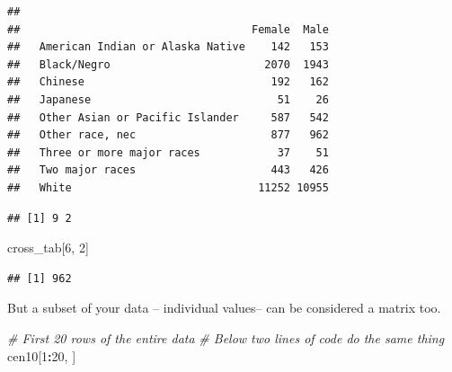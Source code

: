 \documentclass[]{book}
\newenvironment{Shaded}{\begin{snugshade}}{\end{snugshade}}
\newcommand{\CommentTok}[1]{\textcolor[rgb]{0.56,0.35,0.01}{\textit{#1}}}
\newcommand{\DecValTok}[1]{\textcolor[rgb]{0.00,0.00,0.81}{#1}}
\newcommand{\KeywordTok}[1]{\textcolor[rgb]{0.13,0.29,0.53}{\textbf{#1}}}
\newcommand{\NormalTok}[1]{#1}
\newcommand{\OperatorTok}[1]{\textcolor[rgb]{0.81,0.36,0.00}{\textbf{#1}}}
\newcommand{\StringTok}[1]{\textcolor[rgb]{0.31,0.60,0.02}{#1}}
\theoremstyle{definition}
\theoremstyle{definition}
\theoremstyle{definition}
\theoremstyle{remark}
\begin{document}
\begin{verbatim}
##                                   
##                                    Female  Male
##   American Indian or Alaska Native    142   153
##   Black/Negro                        2070  1943
##   Chinese                             192   162
##   Japanese                             51    26
##   Other Asian or Pacific Islander     587   542
##   Other race, nec                     877   962
##   Three or more major races            37    51
##   Two major races                     443   426
##   White                             11252 10955
\end{verbatim}

\begin{Shaded}
\end{Shaded}

\begin{verbatim}
## [1] 9 2
\end{verbatim}

\begin{Shaded}
\begin{Highlighting}[]
\NormalTok{cross_tab[}\DecValTok{6}\NormalTok{, }\DecValTok{2}\NormalTok{]}
\end{Highlighting}
\end{Shaded}

\begin{verbatim}
## [1] 962
\end{verbatim}

But a subset of your data -- individual values-- can be considered a matrix too.

\begin{Shaded}
\begin{Highlighting}[]
\CommentTok{# First 20 rows of the entire data}
\CommentTok{# Below two lines of code do the same thing}
\NormalTok{cen10[}\DecValTok{1}\OperatorTok{:}\DecValTok{20}\NormalTok{, ]}
\end{Highlighting}
\end{Shaded}
\end{document}
